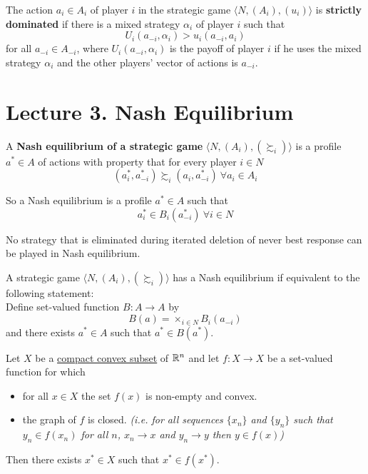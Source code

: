 \documentclass[11pt]{article}
\begin{document}
			\begin{definition}[59.2]
				The action $a_i \in A_i$ of player $i$ in the strategic game $\langle N, (A_i), (u_i) \rangle$ is \textbf{strictly dominated} if there is a mixed strategy $\alpha_i$ of player $i$ such that 
				\[
					U_i(a_{-i}, \alpha_i) > u_i(a_{-i}, a_i)
				\]
				for all $a_{-i} \in A_{-i}$, where $U_i(a_{-i}, \alpha_i)$ is the payoff of player $i$ if he uses the mixed strategy $\alpha_i$ and the other players' vector of actions is $a_{-i}$.
			\end{definition}
		
		
	\section{Lecture 3. Nash Equilibrium}
		\begin{definition}[14.1]
			A \textbf{Nash equilibrium of a strategic game} $\langle N, (A_i), (\succsim_i) \rangle$ is a profile $a^* \in A$ of actions with property that for every player $i \in N$
			\[
				(a_i^*, a^*_{-i}) \succsim_i (a_i, a^*_{-i})\ \forall a_i \in A_i
			\]
		\end{definition}
		
		\begin{proposition}
			So a Nash equilibrium is a profile $a^* \in A$ such that
			\[
				a^*_i \in B_i(a^*_{-i})\ \forall i \in N
			\]
		\end{proposition}
		
		\begin{proposition}[lec.3]
			No strategy that is eliminated during iterated deletion of never best response can be played in Nash equilibrium.
		\end{proposition}
		
		\begin{lemma}[pg.19]
			A strategic game $\langle N, (A_i), (\succsim_i) \rangle$ has a Nash equilibrium if equivalent to the following statement:\\
			Define set-valued function $B: A \to A$ by 
			\[
				B(a) = \times_{i\in N} B_i (a_{-i})
			\]
			and there exists $a^* \in A$ such that $a^* \in B(a^*)$.
		\end{lemma}
	
		\begin{lemma}
			Let $X$ be a \ul{compact convex subset} of $\mathbb{R}^n$ and let $f: X \to X$ be a set-valued function for which
			\begin{itemize}
				\item for all $x \in X$ the set $f(x)$ is non-empty and convex.
				\item the graph of $f$ is closed. \emph{(i.e. for all sequences $\{x_n\}$ and $\{y_n\}$ such that $y_n \in f(x_n)$ for all $n$, $x_n \to x$ and $y_n \to y$ then $y \in f(x)$)}
			\end{itemize}
			Then there exists $x^* \in X$ such that $x^* \in f(x^*)$.
		\end{lemma}
		
\end{document}
